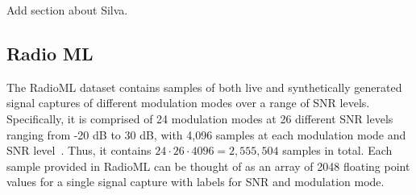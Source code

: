 Add section about Silva. 


\subsection{Radio ML}
The RadioML dataset contains samples of both live and synthetically generated signal captures of different modulation modes over a range of SNR levels. Specifically, it is comprised of 24 modulation modes at 26 different SNR levels ranging from -20 dB to 30 dB, with 4,096 samples at each modulation mode and SNR level~\cite{oshea2018radioml}. Thus, it contains $24 \cdot 26 \cdot 4096 = 2,555,504$ samples in total. Each sample provided in RadioML can be thought of as an array of 2048 floating point values for a single signal capture with labels for SNR and modulation mode.

\label{subsec:radioml}